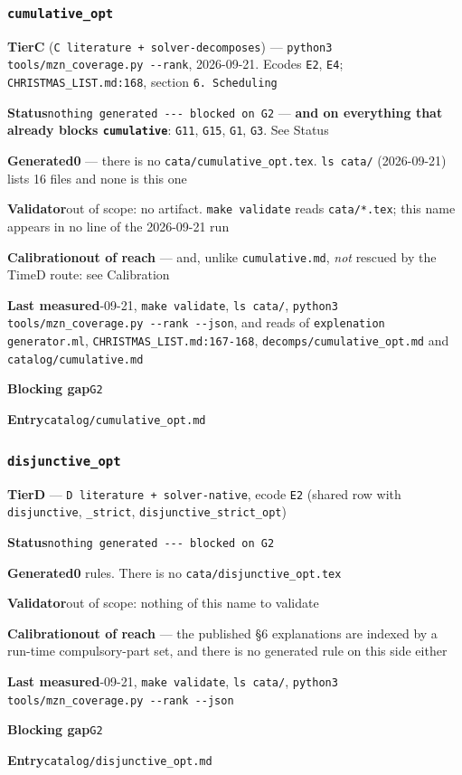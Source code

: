 \documentclass[10pt,a4paper]{article}
\newcommand{\entryfield}[2]{{\raggedright\textbf{#1}\quad #2\par}}
\begin{document}
\subsubsection*{\texttt{cumulative\_\allowbreak{}opt}}
\label{entry:cumulative-opt}
\entryfield{Tier}{\textbf{C} (\texttt{C literature + solver-\allowbreak{}decomposes}) --- \texttt{python3 tools/\allowbreak{}mzn\_\allowbreak{}coverage.\allowbreak{}py -\allowbreak{}-\allowbreak{}rank}, 2026-09-21. Ecodes \texttt{E2}, \texttt{E4}; \texttt{CHRISTMAS\_LIST.md:168}, section \texttt{6. Scheduling}}
\entryfield{Status}{\texttt{nothing generated -\allowbreak{}-\allowbreak{}-\allowbreak{} blocked on G2} --- \textbf{and on everything that already blocks \texttt{cumulative}}: \texttt{G11}, \texttt{G15}, \texttt{G1}, \texttt{G3}. See Status}
\entryfield{Generated}{\textbf{0} --- there is no \texttt{cata/cumulative\_opt.tex}. \texttt{ls cata/} (2026-09-21) lists 16 files and none is this one}
\entryfield{Validator}{out of scope: no artifact. \texttt{make validate} reads \texttt{cata/*.tex}; this name appears in no line of the 2026-09-21 run}
\entryfield{Calibration}{\textbf{out of reach} --- and, unlike \texttt{cumulative.md}, \emph{not} rescued by the TimeD route: see Calibration}
\entryfield{Last measured}{2026-09-21, \texttt{make validate}, \texttt{ls cata/}, \texttt{python3 tools/\allowbreak{}mzn\_\allowbreak{}coverage.\allowbreak{}py -\allowbreak{}-\allowbreak{}rank -\allowbreak{}-\allowbreak{}json}, and reads of \texttt{explenation generator.ml}, \texttt{CHRISTMAS\_\allowbreak{}LIST.\allowbreak{}md:167-\allowbreak{}168}, \texttt{decomps/\allowbreak{}cumulative\_\allowbreak{}opt.\allowbreak{}md} and \texttt{catalog/cumulative.md}}
\entryfield{Blocking gap}{\texttt{G2}}
\entryfield{Entry}{\texttt{catalog/cumulative\_opt.md}}
\subsubsection*{\texttt{disjunctive\_\allowbreak{}opt}}
\label{entry:disjunctive-opt}
\entryfield{Tier}{\textbf{D} --- \texttt{D literature + solver-\allowbreak{}native}, ecode \texttt{E2} (shared row with \texttt{disjunctive}, \texttt{\_strict}, \texttt{disjunctive\_strict\_opt})}
\entryfield{Status}{\texttt{nothing generated -\allowbreak{}-\allowbreak{}-\allowbreak{} blocked on G2}}
\entryfield{Generated}{\textbf{0} rules. There is no \texttt{cata/disjunctive\_opt.tex}}
\entryfield{Validator}{out of scope: nothing of this name to validate}
\entryfield{Calibration}{\textbf{out of reach} --- the published \S{}6 explanations are indexed by a run-time compulsory-part set, and there is no generated rule on this side either}
\entryfield{Last measured}{2026-09-21, \texttt{make validate}, \texttt{ls cata/}, \texttt{python3 tools/\allowbreak{}mzn\_\allowbreak{}coverage.\allowbreak{}py -\allowbreak{}-\allowbreak{}rank -\allowbreak{}-\allowbreak{}json}}
\entryfield{Blocking gap}{\texttt{G2}}
\entryfield{Entry}{\texttt{catalog/disjunctive\_opt.md}}
\end{document}
